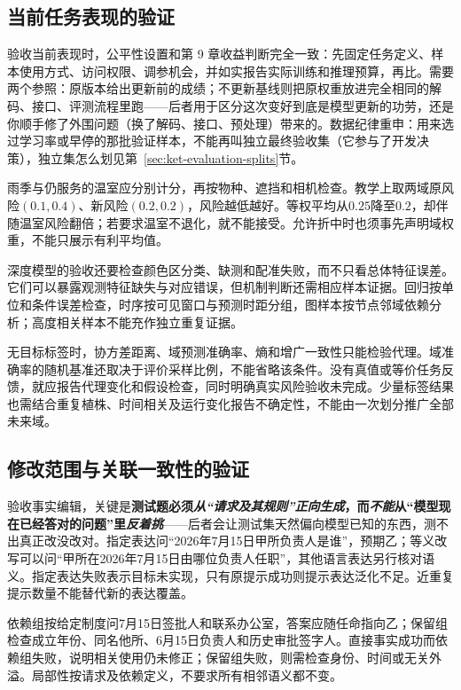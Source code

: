 \subsection{当前任务表现的验证}
\label{sec:ket-update-current-validation}

验收当前表现时，公平性设置和第 9 章收益判断完全一致：先固定任务定义、样本使用方式、访问权限、调参机会，并如实报告实际训练和推理预算，再比。需要两个参照：原版本给出更新前的成绩；不更新基线则把原权重放进完全相同的解码、接口、评测流程里跑——后者用于区分这次变好到底是模型更新的功劳，还是你顺手修了外围问题（换了解码、接口、预处理）带来的。数据纪律重申：用来选过学习率或早停的那批验证样本，不能再叫独立最终验收集（它参与了开发决策），独立集怎么划见第~\ref{sec:ket-evaluation-splits}节。

雨季与仍服务的温室应分别计分，再按物种、遮挡和相机检查。教学上取两域原风险$(0.1,0.4)$、新风险$(0.2,0.2)$，风险越低越好。等权平均从$0.25$降至$0.2$，却伴随温室风险翻倍；若要求温室不退化，就不能接受。允许折中时也须事先声明域权重，不能只展示有利平均值。

深度模型的验收还要检查颜色区分类、缺测和配准失败，而不只看总体特征误差。它们可以暴露观测特征缺失与对应错误，但机制判断还需相应样本证据。回归按单位和条件误差检查，时序按可见窗口与预测时距分组，图样本按节点邻域依赖分析；高度相关样本不能充作独立重复证据。

无目标标签时，协方差距离、域预测准确率、熵和增广一致性只能检验代理。域准确率的随机基准还取决于评价采样比例，不能省略该条件。没有真值或等价任务反馈，就应报告代理变化和假设检查，同时明确真实风险验收未完成。少量标签结果也需结合重复植株、时间相关及运行变化报告不确定性，不能由一次划分推广全部未来域。

\subsection{修改范围与关联一致性的验证}
\label{sec:ket-update-edit-validation}

验收事实编辑，关键是\textbf{测试题必须\emph{从“请求及其规则”\emph{正向}生成}，而\emph{不能}从“模型现在已经答对的问题”里\emph{反着挑}}——后者会让测试集天然偏向模型已知的东西，测不出真正改没改对。指定表达问“2026年7月15日甲所负责人是谁”，预期乙；等义改写可以问“甲所在2026年7月15日由哪位负责人任职”，其他语言表达另行核对语义。指定表达失败表示目标未实现，只有原提示成功则提示表达泛化不足。近重复提示数量不能替代新的表达覆盖。

依赖组按给定制度问7月15日签批人和联系办公室，答案应随任命指向乙；保留组检查成立年份、同名他所、6月15日负责人和历史审批签字人。直接事实成功而依赖组失败，说明相关使用仍未修正；保留组失败，则需检查身份、时间或无关外溢。局部性按请求及依赖定义，不要求所有相邻语义都不变。

